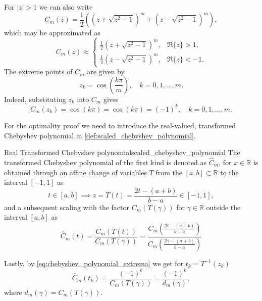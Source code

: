 For $|z|>1$ we can also write
\begin{equation}
  C_m(z) = \frac{1}{2}\left(\left(z + \sqrt{z^2 - 1}\right)^m + \left(z - \sqrt{z^2 - 1}\right)^m\right),
  \label{eq:chebyshev_polynomial_explicit}
\end{equation}
which may be approximated as
\begin{equation}
  C_m(z) \approx \begin{cases}
    \frac{1}{2}\left(z + \sqrt{z^2 - 1}\right)^m, & \Re\{z\} > 1, \\
    \frac{1}{2}\left(z - \sqrt{z^2 - 1}\right)^m, & \Re\{z\} < -1.
  \end{cases} 
  \label{eq:chebyshev_polynomial_approximation}
\end{equation}
The extreme points of $C_m$ are given by
\begin{equation}
  z_k = \cos\left(\frac{k \pi}{m}\right), \quad k = 0, 1, \dots, m.
  \label{eq:chebyshev_polynomial_extreme_points}
\end{equation}
Indeed, substituting $z_k$ into $C_m$ gives 
\begin{equation}
  C_m(z_k) = \cos(k \pi) = \cos(k \pi) = (-1)^k, \quad k = 0, 1, \dots, m.
  \label{eq:chebyshev_polynomial_extrema}
\end{equation}
 
For the optimality proof we need to introduce the real-valued, transformed Chebyshev polynomial in \cref{def:scaled_chebyshev_polynomial}.
\begin{APPfancydef}{Real Transformed Chebyshev polynomial}{scaled_chebyshev_polynomial}
  The transformed Chebyshev polynomial of the first kind is denoted as $\hat{C}_m$, for $x\in\mathbb{R}$ is obtained through an affine change of variables $T$ from the $[a, b] \subset \mathbb{R}$ to the interval $[-1, 1]$ as
  \[
    t \in [a,b] \implies z = T(t) = \frac{2t - (a + b)}{b - a} \in [-1, 1],
  \]
  and a subsequent scaling with the factor $C_m(T(\gamma))$ for $\gamma\in\mathbb{R}$ outside the interval $[a, b]$ as
  \[
    \hat{C}_m(t) = \frac{C_m(T(t))}{C_m(T(\gamma))} = \frac{C_m\left(\frac{2t - (a + b)}{b - a}\right)}{C_m\left(\frac{2\gamma - (a + b)}{b - a}\right)}
  \]
\end{APPfancydef}

Lastly, by \cref{eq:chebyshev_polynomial_extrema} we get for $t_k = T^{-1}(z_k)$
\begin{equation}
    \hat{C}_m(t_k) = \frac{(-1)^k}{C_m(T(\gamma))} = \frac{(-1)^k}{d_m(\gamma)},
    \label{eq:chebyshev_polynomial_extrema_scaled}
\end{equation}
where $d_m(\gamma) = C_m(T(\gamma))$. 

